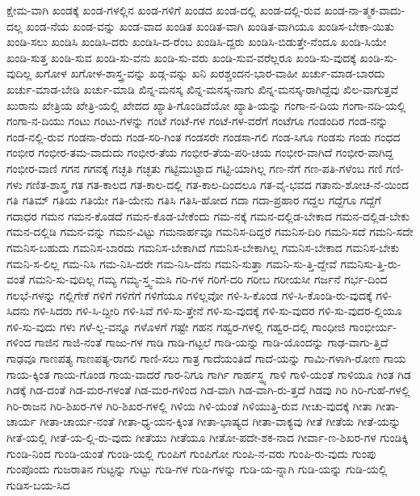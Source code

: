 {ಕ್ಷೇಮ-ವಾಗಿ
ಖಂಡಕ್ಕೆ
ಖಂಡ-ಗಳಲ್ಲಿನ
ಖಂಡ-ಗಳಿಗೆ
ಖಂಡದ
ಖಂಡ-ದಲ್ಲಿ
ಖಂಡ-ದಲ್ಲಿ-ರುವ
ಖಂಡ-ನಾ-ತ್ಮಕ-ವಾದು-ದಲ್ಲ
ಖಂಡ-ನೆಯ
ಖಂಡ-ವನ್ನು
ಖಂಡ-ವಾದ
ಖಂಡಿತ
ಖಂಡಿತ-ವಾಗಿ
ಖಂಡಿತ-ವಾಗಿಯೂ
ಖಂಡಿಸ-ಬೇಕಾ-ಯಿತು
ಖಂಡಿ-ಸಲು
ಖಂಡಿಸಿ
ಖಂಡಿಸಿ-ದರು
ಖಂಡಿಸಿ-ದ-ರೆಂಬ
ಖಂಡಿಸಿ-ದ್ದರು
ಖಂಡಿಸಿ-ಬಿಡುತ್ತೇ-ನೆಂದೂ
ಖಂಡಿ-ಸಿಯೇ
ಖಂಡಿ-ಸುತ್ತ
ಖಂಡಿ-ಸುವ
ಖಂಡಿ-ಸು-ವನು
ಖಂಡಿ-ಸು-ವರು
ಖಂಡಿ-ಸುವ-ವರೆಲ್ಲರೂ
ಖಂಡಿ-ಸು-ವುದಕ್ಕೆ
ಖಂಡಿ-ಸು-ವುದಿಲ್ಲ
ಖಗೋಳ
ಖಗೋಳ-ಶಾಸ್ತ್ರ-ವನ್ನು
ಖಡ್ಗ-ವನ್ನು
ಖನಿ
ಖರಶ್ಚಂದನ-ಭಾರ-ವಾಹೀ
ಖರ್ಚು-ಮಾಡ-ಬಾರದು
ಖರ್ಚು-ಮಾಡ-ಬೇಡಿ
ಖರ್ಚು-ಮಾಡಿ
ಖಿನ್ನ-ಮನಸ್ಕ
ಖಿನ್ನ-ಮನಸ್ಕ-ನಾಗು
ಖಿನ್ನ-ಮನಸ್ಕ-ರಾಗಿದ್ದೆವು
ಖಿಲ-ವಾಗುತ್ತವೆ
ಖುರಾನು
ಖೇತ್ರಿಯ
ಖೇತ್ರಿ-ಯಲ್ಲಿ
ಖೇದದ
ಖ್ಯಾತಿ-ಗೊಂಡಿದೆಯೋ
ಖ್ಯಾತಿ-ಯನ್ನು
ಗಂಗಾ-ನ-ದಿಯ
ಗಂಗಾ-ನದಿ-ಯಲ್ಲಿ
ಗಂಗಾ-ನ-ದಿಯು
ಗಂಟು
ಗಂಟು-ಗಳನ್ನು
ಗಂಟೆ
ಗಂಟೆ-ಗಳ
ಗಂಟೆ-ಗಳ-ವರೆಗೆ
ಗಂಟೆಗೂ
ಗಂಡಂದಿರ
ಗಂಡ-ನನ್ನು
ಗಂಡ-ನಲ್ಲಿ-ರುವ
ಗಂಡನಾ-ರೆಂದು
ಗಂಡ-ಸರಿ-ಗಿಂತ
ಗಂಡಸರೇ
ಗಂಡಸಾ-ಗಲಿ
ಗಂಡ-ಸಿಗೂ
ಗಂಡಸು
ಗಂಡು
ಗಂಧದ
ಗಂಭೀರ
ಗಂಭೀರ-ತಮ-ವಾದುದು
ಗಂಭೀರ-ತೆಯ
ಗಂಭೀರ-ತೆಯ-ಪರಿ-ಚಯ
ಗಂಭೀರ-ವಾಗಿದೆ
ಗಂಭೀರ-ವಾಗಿದ್ದ
ಗಂಭೀರ-ವಾಣಿ
ಗಗನ
ಗಗನಕ್ಕೆ
ಗಚ್ಛತಿ
ಗಚ್ಛತು
ಗಟ್ಟಿಮುಟ್ಟಾದ
ಗಟ್ಟಿ-ಯಾಗಿಲ್ಲ
ಗಣ-ನೆಗೆ
ಗಣ-ಪತಿ-ಗಳೆಂಬ
ಗಣಿ
ಗಣಿ-ಗಳು
ಗಣಿತ-ಶಾಸ್ತ್ರ
ಗತ
ಗತ-ಕಾಲದ
ಗತ-ಕಾಲ-ದಲ್ಲಿ
ಗತ-ಕಾಲ-ದಿಂದಲೂ
ಗತ-ವೈ-ಭವದ
ಗತಾನು-ಶೋಚ-ನೆ-ಯಿಂದ
ಗತಿ
ಗತಿಮ್
ಗತಿಯ
ಗತಿಯೇ
ಗತಿ-ಯೇನು
ಗತಿಸಿ
ಗತಿಸಿ-ಹೋದ
ಗದಾ
ಗದಾ-ಪ್ರಹಾರ
ಗದ್ದಲ
ಗದ್ದೆಗೂ
ಗದ್ದೆಗೆ
ಗದಾಧರ
ಗಮನ
ಗಮನ-ಕೊಡದೆ
ಗಮನ-ಕೊಡ-ಬೇಕೆಂದು
ಗಮ-ನಕ್ಕೆ
ಗಮನ-ದಲ್ಲಿಡ-ಬೇಕಾದ
ಗಮನ-ದಲ್ಲಿಡ-ಬೇಕು
ಗಮನ-ದಲ್ಲಿಡಿ
ಗಮನ-ವನ್ನು
ಗಮನ-ವಿಟ್ಟು
ಗಮನಾರ್ಹವೂ
ಗಮನಿಸ-ದಿದ್ದರೆ
ಗಮನಿಸ-ದಿರಿ
ಗಮನಿ-ಸದೆ
ಗಮನಿ-ಸದೇ
ಗಮನಿಸ-ಬಹುದು
ಗಮನಿಸ-ಬಾರದು
ಗಮನಿಸ-ಬೇಕಾಗಿದೆ
ಗಮನಿಸ-ಬೇಕಾಗಿಲ್ಲ
ಗಮನಿಸ-ಬೇಕಾದ
ಗಮನಿಸ-ಬೇಕು
ಗಮನಿ-ಸ-ಲಿಲ್ಲ
ಗಮ-ನಿಸಿ
ಗಮ-ನಿಸಿ-ದರೇ
ಗಮ-ನಿಸಿ-ದೆನು
ಗಮನಿ-ಸುತ್ತಾ
ಗಮನಿ-ಸು-ತ್ತಿ-ದ್ದೇವೆ
ಗಮನಿಸು-ತ್ತಿ-ರು-ವಂತೆ
ಗಮನಿ-ಸು-ವುದಿಲ್ಲ
ಗಮ್ಯ
ಗಮ್ಯ-ಸ್ತ್ವ-ಮಸಿ
ಗರಿ-ಗಳ
ಗರಿಗೆ-ದರಿ
ಗರೀಬ
ಗರೀಯಸೀ
ಗರ್ಜನೆ
ಗರ್ಭ-ದಿಂದ
ಗಲಭೆ-ಗಳನ್ನು
ಗಲ್ಲಿಗೇಕೆ
ಗಳಿಗೆ
ಗಳಿಗೆಗೆ
ಗಳಿಗೆಯೂ
ಗಳಿಲ್ಲವೋ
ಗಳಿ-ಸಿ-ಕೊಂಡ
ಗಳಿ-ಸಿ-ಕೊಂಡಿ-ರು-ವುದಕ್ಕೆ
ಗಳಿ-ಸಿದನು
ಗಳಿ-ಸಿದರು
ಗಳಿ-ಸಿ-ದ್ದೀರಿ
ಗಳಿ-ಸಿವೆ
ಗಳಿ-ಸು-ತ್ತೇನೆ
ಗಳಿ-ಸು-ವುದಕ್ಕೆ
ಗಳಿ-ಸು-ವುದರ
ಗಳಿ-ಸು-ವುದರ-ಲ್ಲಿಯೂ
ಗಳಿ-ಸು-ವುದು
ಗಳು
ಗಳೆ-ಲ್ಲ-ವನ್ನೂ
ಗಳೊಳಗೆ
ಗಷ್ಟೇ
ಗಹನ
ಗಹ್ವರ-ಗಳಲ್ಲಿ
ಗಹ್ವರ-ದಲ್ಲಿ
ಗಾಂಧೀಜಿ
ಗಾಂಭೀರ್ಯ-ಗಳಿಂದ
ಗಾಜಿನ
ಗಾಜಿ-ನಂತೆ
ಗಾಜು-ಗಳ
ಗಾಡಿ
ಗಾಡಿ-ಗಟ್ಟಲೆ
ಗಾಡಿ-ಯನ್ನು
ಗಾಡಿ-ಯೊಂದನ್ನು
ಗಾಢ-ವಾಗು-ತ್ತಿದೆ
ಗಾಢವೂ
ಗಾಣಪತ್ಯ
ಗಾಣಪತ್ಯ-ರಾಗಲಿ
ಗಾಣಿ-ಸಲು
ಗಾತ್ರ
ಗಾದೆಯಂತಿದೆ
ಗಾದೆ-ಯನ್ನು
ಗಾಮಿ-ಗಳಾಗಿ-ರೋಣ
ಗಾಯ
ಗಾಯ-ಕ್ಕಿಂತ
ಗಾಯ-ಗೊಂಡ
ಗಾಯ-ವಾದರೆ
ಗಾರ-ನಿಗೂ
ಗಾರ್ಗಿ
ಗಾರ್ಹಸ್ಥ್ಯ
ಗಾಳಿ
ಗಾಳಿ-ಯಂತೆ
ಗಾಳಿಯೂ
ಗಿಂತ
ಗಿಡ
ಗಿಡಕ್ಕೆ
ಗಿಡ-ದಂತೆ
ಗಿಡ-ಮರ-ಗಳಂತೆ
ಗಿಡ-ಮರ-ಗಳಿಂದ
ಗಿಡ-ವಾಗಿ
ಗಿಡ-ವಾಗಿ-ರು-ತ್ತದೆ
ಗಿಡವು
ಗಿರಿ
ಗಿರಿ-ಗುಹೆ-ಗಳಲ್ಲಿ
ಗಿರಿ-ರಾಜನ
ಗಿರಿ-ಶಿಖರ-ಗಳ
ಗಿರಿ-ಶಿಖರ-ಗಳಲ್ಲಿ
ಗಿಳಿಯ
ಗಿಳಿ-ಯಂತೆ
ಗಿಳಿಯುತ್ತಿ-ರುವ
ಗೀಚು-ವುದಕ್ಕೆ
ಗೀತಾ
ಗೀತಾ-ಚಾರ್ಯ
ಗೀತಾ-ಚಾರ್ಯ-ನಂತೆ
ಗೀತಾ-ಧ್ಯ-ಯನ-ಕ್ಕಿಂತ
ಗೀತಾ-ಭಾಷ್ಯದ
ಗೀತಾ-ವಾಕ್ಯವು
ಗೀತೆ
ಗೀತೆಯ
ಗೀತೆ-ಯನ್ನು
ಗೀತೆ-ಯಲ್ಲಿ
ಗೀತೆ-ಯ-ಲ್ಲಿ-ರು-ವುದು
ಗೀತೆಯು
ಗೀತೆಯೂ
ಗೀತೋ-ಪದೇ-ಶಕ-ನಾದ
ಗೀರ್ವಾ-ಣ-ಶಿಖರ-ಗಳ
ಗುಂಡಿಕ್ಕಿ
ಗುಂಡಿ-ನಿಂದ
ಗುಂಡಿ-ಯಂತೆ
ಗುಂಡಿ-ಯಲ್ಲಿ
ಗುಂಪಿಗೆ
ಗುಂಪಿಗೋ
ಗುಂಪಿ-ನ-ವರು
ಗುಂಪಿ-ರು-ವುದು
ಗುಂಪು
ಗುಂಪೊಂದು
ಗುಜರಾತಿನ
ಗುಟ್ಟನ್ನು
ಗುಟ್ಟು
ಗುಡಿ-ಗಳ
ಗುಡಿ-ಗಳನ್ನು
ಗುಡಿ-ಯ-ನ್ನಾಗಿ
ಗುಡಿ-ಯನ್ನು
ಗುಡಿ-ಯಲ್ಲಿ
ಗುಡಿಸ-ಬಯ-ಸಿದ
}

